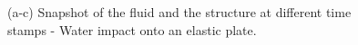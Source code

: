 \documentclass[10pt, conference]{FMFP2022}
\begin{document}
\begin{figure}
{    }
    \caption
    {
        (a-c) Snapshot of the fluid and the structure at different time stamps - Water impact onto an elastic plate.
    }
    \label{fig:dam-breaking-onto-plate-snapshot}
\end{figure}








\end{document}
